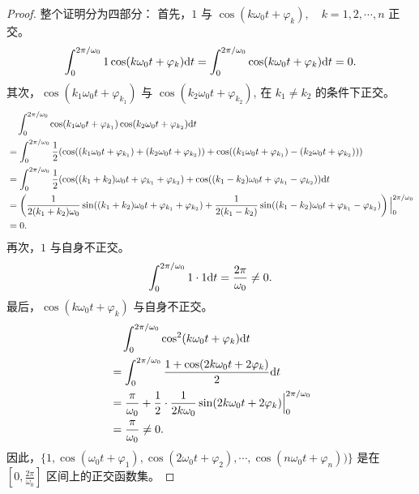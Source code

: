 \begin{proof}
    整个证明分为四部分：
    首先，$1$ 与 $\cos(k\omega_0t + \varphi_k), \quad k = 1, 2, \cdots, n$ 正交。
    \begin{align*}
        \int_{0}^{2\pi/\omega_0}1\cos(k\omega_0t + \varphi_k)\mathrm{d}{t}
        = \int_{0}^{2\pi/\omega_0}\cos(k\omega_0t + \varphi_k)\mathrm{d}{t}
        = 0.
    \end{align*}
    其次，$\cos(k_1\omega_0t + \varphi_{k_1})$ 与 $\cos(k_2\omega_0t + \varphi_{k_2})$, 在 $k_1 \ne k_2$ 的条件下正交。
    \begin{align*}
        & \quad \int_{0}^{2\pi/\omega_0}\cos(k_1\omega_0t + \varphi_{k_1})\cos(k_2\omega_0t + \varphi_{k_2})\mathrm{d}{t} \\
        & = \int_{0}^{2\pi/\omega_0}\frac{1}{2}(\cos((k_1\omega_0t + \varphi_{k_1}) + (k_2\omega_0t + \varphi_{k_2})) + \cos((k_1\omega_0t + \varphi_{k_1}) - (k_2\omega_0t + \varphi_{k_2}))) \\
        & = \int_{0}^{2\pi/\omega_0}\frac{1}{2}(\cos((k_1 + k_2)\omega_0t + \varphi_{k_1} + \varphi_{k_2}) + \cos((k_1 - k_2)\omega_0t + \varphi_{k_1} - \varphi_{k_2}))\mathrm{d}{t} \\
        & = \left(\frac{1}{2(k_1 + k_2)\omega_0}\sin((k_1 + k_2)\omega_0t + \varphi_{k_1} + \varphi_{k_2})
            + \frac{1}{2(k_1 - k_2)}\sin((k_1 - k_2)\omega_0t + \varphi_{k_1} - \varphi_{k_2})\right)\Big|_{0}^{2\pi/\omega_0} \\
        & = 0.
    \end{align*}
    再次，$1$ 与自身不正交。
    \begin{align*}
        \int_{0}^{2\pi/\omega_0}1\cdot 1\mathrm{d}{t}
        = \frac{2\pi}{\omega_0} \ne 0.
    \end{align*}
    最后，$\cos(k\omega_0t + \varphi_k)$ 与自身不正交。
    \begin{align*}
        & \quad \int_{0}^{2\pi/\omega_0}\cos^2(k\omega_0t + \varphi_k)\mathrm{d}{t} \\
        & = \int_{0}^{2\pi/\omega_0}\frac{1 + \cos(2k\omega_0t + 2\varphi_k)}{2}\mathrm{d}{t} \\
        & = \frac{\pi}{\omega_0} + \frac{1}{2}\cdot\frac{1}{2k\omega_0}\sin(2k\omega_0t + 2\varphi_k)\Big|_{0}^{2\pi/\omega_0} \\
        & = \frac{\pi}{\omega_0} \ne 0.
    \end{align*}
    因此，$\{1, \cos(\omega_0t + \varphi_1), \cos(2\omega_0t + \varphi_2), \cdots, \cos(n\omega_0 t + \varphi_n))\}$
    是在 $[0, \frac{2\pi}{\omega_0}]$ 区间上的正交函数集。
\end{proof}

